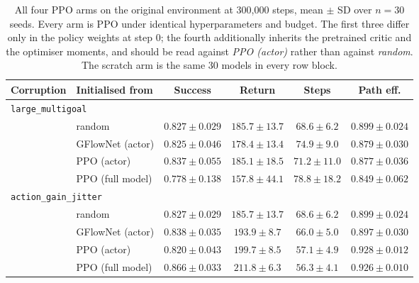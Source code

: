 \begin{table}[htbp]
\centering
\setlength{\tabcolsep}{4pt}
\caption{All four PPO arms on the original environment at 300{,}000 steps,
mean $\pm$ SD over $n=30$ seeds. Every arm is PPO under identical
hyperparameters and budget. The first three differ only in the policy
weights at step 0; the fourth additionally inherits the pretrained critic
and the optimiser moments, and should be read against \emph{PPO (actor)}
rather than against \emph{random}. The scratch arm is the same 30 models
in every row block.}
\small
\begin{tabular}{llcccc}
\toprule
Corruption & Initialised from & Success & Return & Steps & Path eff. \\
\midrule
\multicolumn{6}{l}{\texttt{large\_multigoal}} \\
 & random & $0.827 \pm 0.029$ & $185.7 \pm 13.7$ & $68.6 \pm 6.2$ & $0.899 \pm 0.024$ \\
 & GFlowNet (actor) & $0.825 \pm 0.046$ & $178.4 \pm 13.4$ & $74.9 \pm 9.0$ & $0.879 \pm 0.030$ \\
 & PPO (actor) & $0.837 \pm 0.055$ & $185.1 \pm 18.5$ & $71.2 \pm 11.0$ & $0.877 \pm 0.036$ \\
 & PPO (full model) & $0.778 \pm 0.138$ & $157.8 \pm 44.1$ & $78.8 \pm 18.2$ & $0.849 \pm 0.062$ \\
\midrule
\multicolumn{6}{l}{\texttt{action\_gain\_jitter}} \\
 & random & $0.827 \pm 0.029$ & $185.7 \pm 13.7$ & $68.6 \pm 6.2$ & $0.899 \pm 0.024$ \\
 & GFlowNet (actor) & $0.838 \pm 0.035$ & $193.9 \pm 8.7$ & $66.0 \pm 5.0$ & $0.897 \pm 0.030$ \\
 & PPO (actor) & $0.820 \pm 0.043$ & $199.7 \pm 8.5$ & $57.1 \pm 4.9$ & $0.928 \pm 0.012$ \\
 & PPO (full model) & $0.866 \pm 0.033$ & $211.8 \pm 6.3$ & $56.3 \pm 4.1$ & $0.926 \pm 0.010$ \\
\bottomrule
\end{tabular}
\end{table}

